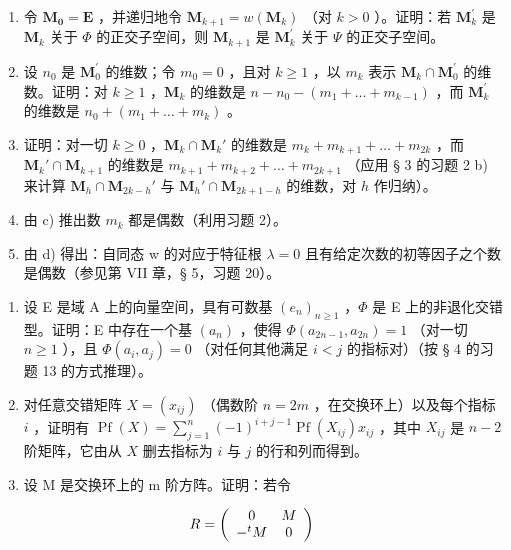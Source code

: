 \begin{enumerate}
\def\labelenumi{\alph{enumi})}
\item
  令 \(\mathbf{M}_{\mathbf{0}} = \mathbf{E}\) ，并递归地令 \(\mathbf{M}_{k+1} = w(\mathbf{M}_{k})\) （对 \(k > 0\) ）。证明：若 \(\mathbf{M}_{k}^{\prime}\) 是 \(\mathbf{M}_{k}\) 关于 \(\Phi\) 的正交子空间，则 \(\mathbf{M}_{k+1}\) 是 \(\mathbf{M}_{k}^{\prime}\) 关于 \(\Psi\) 的正交子空间。
\item
  设 \(n_{0}\) 是 \(\mathbf{M}_{0}^{\prime}\) 的维数；令 \(m_{0}=0\) ，且对 \(k\geqslant1\) ，以 \(m_{k}\) 表示 \(\mathbf{M}_{k}\cap\mathbf{M}_{0}^{\prime}\) 的维数。证明：对 \(k\geqslant1\) ，\(\mathbf{M}_{k}\) 的维数是 \(n-n_{0}-(m_{1}+\ldots+m_{k-1})\) ，而 \(\mathbf{M}_{k}^{\prime}\) 的维数是 \(n_{0}+(m_{1}+\ldots+m_{k})\) 。
\item
  证明：对一切 \(k \geqslant 0\) ，\(\mathbf{M}_k \cap \mathbf{M}_k'\) 的维数是 \(m_k + m_{k+1} + \ldots + m_{2k}\) ，而 \(\mathbf{M}_k' \cap \mathbf{M}_{k+1}\) 的维数是 \(m_{k+1} + m_{k+2} + \ldots + m_{2k+1}\) （应用 § 3 的习题 2 b) 来计算 \(\mathbf{M}_h \cap \mathbf{M}_{2k-h}'\) 与 \(\mathbf{M}_h' \cap \mathbf{M}_{2k+1-h}\) 的维数，对 \(h\) 作归纳）。
\item
  由 c) 推出数 \(m_{k}\) 都是偶数（利用习题 2）。
\item
  由 d) 得出：自同态 w 的对应于特征根 \(\lambda = 0\) 且有给定次数的初等因子之个数是偶数（参见第 VII 章，§ 5，习题 20）。
\end{enumerate}

\begin{enumerate}
\def\labelenumi{\arabic{enumi})}
\setcounter{enumi}{3}
\item
  设 E 是域 A 上的向量空间，具有可数基 \((e_n)_{n\geqslant 1}\) ，\(\Phi\) 是 E 上的非退化交错型。证明：E 中存在一个基 \((a_n)\) ，使得 \(\Phi(a_{2n-1}, a_{2n}) = 1\) （对一切 \(n\geqslant 1\) ），且 \(\Phi(a_i, a_j) = 0\) （对任何其他满足 \(i < j\) 的指标对）（按 § 4 的习题 13 的方式推理）。
\item
  对任意交错矩阵 \(X = (x_{ij})\) （偶数阶 \(n = 2m\) ，在交换环上）以及每个指标 \(i\) ，证明有 \(\operatorname{Pf}(X) = \sum_{j=1}^{n} (-1)^{i+j-1} \operatorname{Pf}(X_{ij}) x_{ij}\) ，其中 \(X_{ij}\) 是 \(n - 2\) 阶矩阵，它由从 \(X\) 删去指标为 \(i\) 与 \(j\) 的行和列而得到。
\item
  设 M 是交换环上的 m 阶方阵。证明：若令
\end{enumerate}

\[
R = \left( \begin{array}{c c} 0 & M \\ - ^ {t} M & 0 \end{array} \right)
\]

